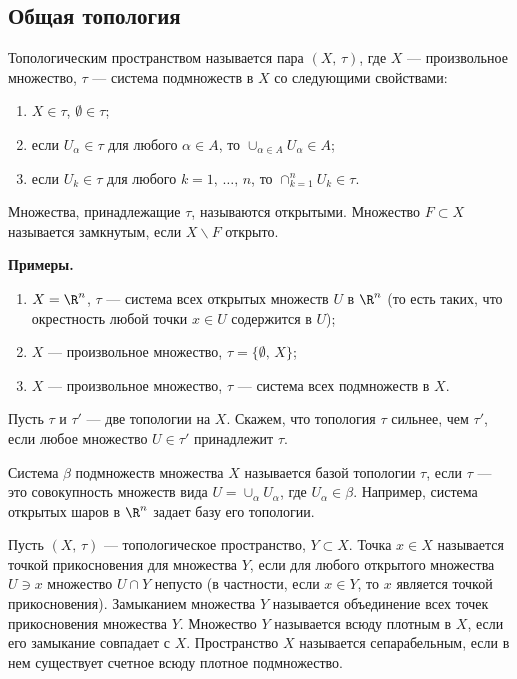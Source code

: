 \documentclass[a4paper
]{article}
\begin{document}
\subsection{Общая топология}
\begin{Def}
Топологическим пространством называется пара $(X, \, \tau)$, где
$X$ --- произвольное множество, $\tau$ --- система подмножеств в
$X$ со следующими свойствами:
\begin{enumerate}
\item $X\in \tau$, $\emptyset\in \tau$;
\item если $U_\alpha\in \tau$ для любого $\alpha\in A$, то
$\cup _{\alpha\in A}U_\alpha\in A$;
\item если $U_k\in \tau$ для любого $k=1, \, \dots, \, n$, то
$\cap _{k=1}^n U_k\in \tau$.
\end{enumerate}
\end{Def}
Множества, принадлежащие $\tau$, называются открытыми. Множество
$F\subset X$ называется замкнутым, если $X\backslash F$ открыто. \par
{\bf Примеры.}
\begin{enumerate}
\item $X=\R^n$, $\tau$ --- система всех открытых множеств $U$ в $\R^n$
(то есть таких, что окрестность любой точки $x\in U$ содержится в
$U$);
\item $X$ --- произвольное множество, $\tau=\{\emptyset, \, X\}$;
\item $X$ --- произвольное множество, $\tau$ --- система всех
подмножеств в $X$.
\end{enumerate}
Пусть $\tau$ и $\tau'$ --- две топологии на $X$. Скажем, что топология
$\tau$ сильнее, чем $\tau'$, если любое множество $U\in \tau'$
принадлежит $\tau$. \par
Система $\beta$ подмножеств множества $X$ называется базой топологии
$\tau$, если $\tau$ --- это совокупность множеств вида
$U=\cup_\alpha U_\alpha$, где $U_\alpha\in \beta$. Например,
система открытых шаров в $\R^n$ задает базу его топологии. \par
Пусть $(X, \, \tau)$ --- топологическое пространство, $Y\subset X$.
Точка $x\in X$ называется точкой прикосновения для множества $Y$,
если для любого открытого множества $U\ni x$ множество $U\cap Y$
непусто (в частности, если $x\in Y$, то $x$ является точкой прикосновения).
Замыканием множества $Y$ называется объединение всех точек прикосновения
множества $Y$. Множество $Y$ называется всюду плотным в $X$, если
его замыкание совпадает с $X$. Пространство $X$ называется
сепарабельным, если в нем существует счетное всюду плотное подмножество.
\end{document}
